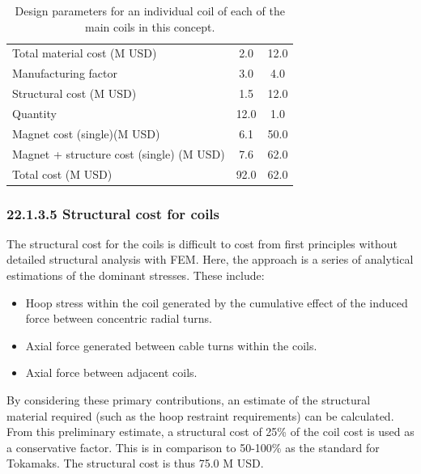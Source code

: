\begin{table}[h]
{\begin{tabular}{lcc}
Total material cost (M USD) & 2.0 & 12.0 \\
Manufacturing factor & 3.0 & 4.0 \\
Structural cost (M USD) & 1.5 & 12.0 \\
Quantity & 12.0 & 1.0 \\
Magnet cost (single)(M USD) & 6.1 & 50.0 \\
Magnet + structure cost (single) (M USD) & 7.6 & 62.0 \\
\hline
Total cost (M USD) & 92.0 & 62.0 \\
\hline
\end{tabular}}
\caption{Design parameters for an individual coil of each of the main coils in this concept.}
\label{your-table-label}
\end{table}


\subsubsection*{22.1.3.5 Structural cost for coils}

The structural cost for the coils is difficult to cost from first principles without detailed structural analysis with FEM. Here, the approach is a series of analytical estimations of the dominant stresses. These include:

\begin{itemize}
    \item Hoop stress within the coil generated by the cumulative effect of the induced force between concentric radial turns.
    \item Axial force generated between cable turns within the coils. 
    \item Axial force between adjacent coils.
\end{itemize}


By considering these primary contributions, an estimate of the structural material required (such as the hoop restraint requirements) can be calculated. From this preliminary estimate, a structural cost of 25\% of the coil cost is used as a conservative factor. This is in comparison to 50-100\% as the standard for Tokamaks. The structural cost is thus 75.0 M USD.


